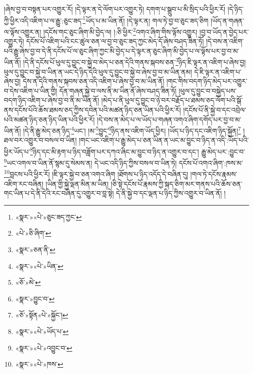 །ཞེས་བྱ་བ་བསྟན་པར་འགྱུར་རོ། །དེ་ལྟར་ན་དེ་ལོག་པར་འགྱུར་ཏེ། དགག་པ་སྒྲུབ་པ་མི་སྲིད་པའི་ཕྱིར་རོ། །དེ་ཉིད་ཀྱི་ཕྱིར་འདི་འཇིག་པ་ལ་རྒྱུ་:ཅུང་ཟད་\footnote{«སྣར་»«པེ་»ཅུང་ཟད་ཀྱང་}ཡོད་པ་མ་ཡིན་ནོ། །དེ་ལྟར་ན། གལ་ཏེ་བྱ་བ་ཅུང་ཟད་ཅིག །ཡོད་ན་གཞན་ལ་ལྟོས་འགྱུར་ན། །དངོས་གང་ཅུང་ཞིག་མི་བྱེད་ལ། །:ཅི་ཕྱིར་\footnote{«པེ་»ཅི་ཞིག་}འགའ་ཞིག་གིས་ལྟོས་འགྱུར། །བྱ་བ་ཡོད་ན་བྱེད་པར་འགྱུར་ཏེ། དངོས་པོ་འཇིག་པའི་ངང་ཚུལ་ཅན་ལ་བྱ་བ་ཅུང་ཟད་ཀྱང་མེད་དོ་ཞེས་བཤད་ཟིན་ཏོ། །དེ་བས་ན་འཇིག་པའི་རྒྱུ་ཞེས་བྱ་བ་དེ་ནི་དངོས་པོ་ལ་ཅུང་ཞིག་ཀྱང་མི་བྱེད་པ་དེ་ལྟར་ན་ཅུང་ཞིག་མི་བྱེད་པ་ལ་ལྟོས་པར་བྱ་བ་མ་ཡིན་ནོ། །དེ་ནི་དངོས་པོ་ཕུལ་དུ་བྱུང་བ་སྐྱེ་བ་མེད་པ་ཅན་དེའི་གནས་སྐབས་ཅན་\footnote{«སྣར་»ཅན་ནི་}ཉིད་ཇི་ལྟར་ན་འཇིག་པ་ཞེས་བྱ། ཕུལ་དུ་བྱུང་བ་སྐྱེ་བ་ཡིན་ན་ཡང་དེ་ཉིད་དེའི་ཕུལ་དུ་བྱུང་བ་སྐྱེ་བ་ཞེས་བྱ་བ་མ་ཡིན་ནམ། དེ་ཇི་ལྟར་ན་འཇིག་པ་ཞེས་བྱ། དེས་ན་དེའི་གནས་སྐབས་ཅན་འདི་འཇིག་པ་ཞེས་བྱ་བ་མ་ཡིན་ནོ། །གང་གིས་བདག་ཉིད་མེད་པར་འགྱུར་བ་དེས་འཇིག་པ་ཡིན་གྱི། དོན་གཞན་སྐྱེ་བ་ལས་ནི་མ་ཡིན་ནོ་ཞེས་བཤད་ཟིན་ཏོ། །ཕུལ་དུ་བྱུང་བ་བསྐྱེད་པས་བདག་ཉིད་འཇིག་པ་ཞེས་བྱ་བ་ནི་མ་ཡིན་ནོ། །མེད་པ་ནི་ཕུལ་དུ་བྱུང་བ་ཉེ་བར་བརྗོད་པ་ཐམས་ཅད་ལོག་པའི་སྒོ་ནས་དངོས་པོའི་ཆོས་ཐམས་ཅད་ཀྱིས་དབེན་པའི་མཚན་ཉིད་ཅན་ཡིན་པའི་ཕྱིར་རོ། །དངོས་པོ་ནི་སྐྱེ་བ་དང་འབྲེལ་པའི་མཚན་ཉིད་ཅན་ཉིད་ཡིན་པའི་ཕྱིར་རོ། །དེ་བས་ན་མེད་པ་ལ་ཡོད་པ་གཞན་འགའ་ཞིག་དགོད་པར་བྱ་བ་མ་ཡིན་ནོ། །དེ་ནི་རྒྱུ་མེད་ཅན་ཉིད་\footnote{«སྣར་»«པེ་»ཡིན་}ཡང་། །མ་\footnote{«ཅོ་»མེ་}བྱུང་\footnote{«སྣར་»བྱུང་བ་}ཉིད་ནས་འཇིག་ཡོད་ཕྱིར། །ཡོད་པ་ཉིད་དང་འཇིག་ཉིད་སྐྱོན།\footnote{«ཅོ་»སྟོན«པེ་»སྐྱོང་།} །ཐལ་བར་འགྱུར་བ་བསལ་བ་ཡིན། །གང་ཡང་འཇིག་པ་རྒྱུ་མེད་པ་ཅན་ཡིན་ན་ཡང་མ་བྱུང་བ་ཉིད་ན་འདི་:ཡོད་པའི་ཕྱིར་ཡོད་པ་\footnote{«སྣར་»«པེ་»ཡོད་པ་}ཉིད་དང་མི་རྟག་པ་ཉིད་བཟློག་པར་དཀའ་ཞིང་མ་བྱུང་བ་ཉིད་ན་འགྱུར་བ་དང་། རྒྱུ་མེད་པར་:བྱུང་བ་\footnote{«སྣར་»«པེ་»འབྱུང་བ་}ཡང་འགལ་བ་ཡིན་ནོ་སྙམ་དུ་སེམས་ན། དེ་ཡང་འདི་ཉིད་ཀྱིས་བསལ་བ་ཡིན་ཏེ། དངོས་པོ་འགའ་ཞིག་:ཁས་མ་\footnote{«སྣར་»«པེ་»ཁས་}བླངས་པའི་ཕྱིར་རོ། །ཇི་ལྟར་སྐྱེ་བ་ཅན་འགའ་ཞིག །ཐོགས་པ་ཉིད་འདོད་དེ་བཞིན་དུ། །གལ་ཏེ་དངོས་རྣམས་འཇིག་རང་བཞིན། །ཡིན་གྱི་སྐྱེ་ལྡན་མིན་མ་ཡིན། །ཅི་སྟེ་དངོས་པོ་རྣམས་ཀྱི་སྐད་ཅིག་མར་གནས་པའི་ཆོས་ཅན་གང་ཡིན་པ་དེ་ནི་དེའི་རང་བཞིན་དུ་འགྱུར་བ་བླ་སྟེ། དེ་ནི་སྐྱེ་བ་དང་ལྡན་པ་ཉིད་ཀྱིས་འགྱུར་བ་ཡིན་ནོ། །
